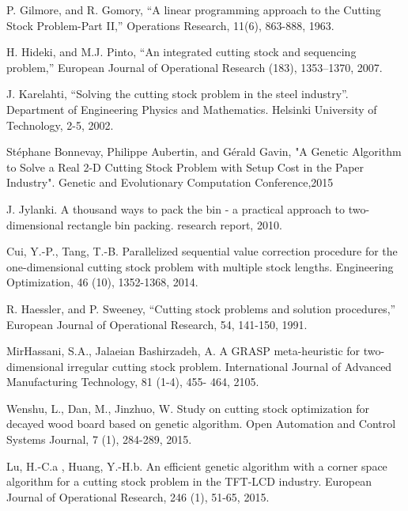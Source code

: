 \documentclass[a4paper,10pt,twocolumn]{article}
\begin{document}
\begin{thebibliography}{99}
	 P. Gilmore, and R. Gomory, “A linear programming
	approach to the Cutting Stock Problem-Part II,”
	Operations Research, 11(6), 863-888, 1963.
	
	 H. Hideki, and M.J. Pinto, “An integrated cutting
	stock and sequencing problem,” European Journal of
	Operational Research (183), 1353–1370, 2007.
	
	J. Karelahti, “Solving the cutting stock problem in
	the steel industry”. Department of Engineering Physics
	and Mathematics. Helsinki University of Technology,
	2-5, 2002.
	
	 Stéphane Bonnevay, Philippe Aubertin, and Gérald Gavin, "A Genetic Algorithm to Solve a Real 2-D Cutting Stock
	Problem with Setup Cost in the Paper Industry". Genetic and Evolutionary Computation Conference,2015
	
	 J. Jylanki. A thousand ways to pack the bin - a
	practical approach to two-dimensional rectangle bin
	packing. research report, 2010.
	
	  Cui, Y.-P., Tang, T.-B. Parallelized sequential value correction procedure for the one-dimensional cutting
	stock problem with multiple stock lengths. Engineering
	Optimization, 46 (10), 1352-1368, 2014.
	
	 R. Haessler, and P. Sweeney, “Cutting stock
	problems and solution procedures,” European Journal
	of Operational Research, 54, 141-150, 1991.
	
	 MirHassani, S.A., Jalaeian Bashirzadeh, A. A
	GRASP meta-heuristic for two-dimensional irregular
	cutting stock problem. International Journal of
	Advanced Manufacturing Technology, 81 (1-4), 455-
	464, 2105.
	
	  Wenshu, L., Dan, M., Jinzhuo, W. Study on cutting
	stock optimization for decayed wood board based
	on genetic algorithm. Open Automation and Control
	Systems Journal, 7 (1), 284-289, 2015.
	
	  Lu, H.-C.a , Huang, Y.-H.b. An efficient genetic
	algorithm with a corner space algorithm for a cutting
	stock problem in the TFT-LCD industry. European
	Journal of Operational Research, 246 (1), 51-65, 2015.
	

\end{thebibliography}
\end{document}
